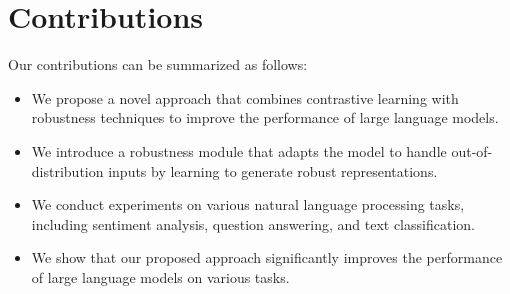 \documentclass{article}
\begin{document}
\section{Contributions}

Our contributions can be summarized as follows:

\begin{itemize}
\item We propose a novel approach that combines contrastive learning with robustness techniques to improve the performance of large language models.
\item We introduce a robustness module that adapts the model to handle out-of-distribution inputs by learning to generate robust representations.
\item We conduct experiments on various natural language processing tasks, including sentiment analysis, question answering, and text classification.
\item We show that our proposed approach significantly improves the performance of large language models on various tasks.
\end{itemize}
\end{document}
